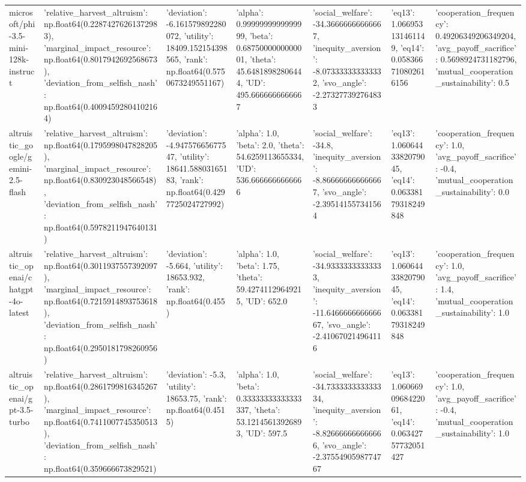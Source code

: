 \begin{table}
\begin{tabular}{lllllll}
microsoft/phi-3.5-mini-128k-instruct & {'relative_harvest_altruism': np.float64(0.22874276261372983), 'marginal_impact_resource': np.float64(0.8017942692568673), 'deviation_from_selfish_nash': np.float64(0.40094592804102164)} & {'deviation': -6.161579892280072, 'utility': 18409.152154398565, 'rank': np.float64(0.5750673249551167)} & {'alpha': 0.9999999999999999, 'beta': 0.6875000000000001, 'theta': 45.64818982806444, 'UD': 495.6666666666667} & {'social_welfare': -34.36666666666667, 'inequity_aversion': -8.073333333333332, 'svo_angle': -2.273277392764833} & {'eq13': 1.066953131461149, 'eq14': 0.058366710802616156} & {'cooperation_frequency': 0.49206349206349204, 'avg_payoff_sacrifice': 0.5698924731182796, 'mutual_cooperation_sustainability': 0.5} \\
altruistic_google/gemini-2.5-flash & {'relative_harvest_altruism': np.float64(0.1795998047828205), 'marginal_impact_resource': np.float64(0.830923048566548), 'deviation_from_selfish_nash': np.float64(0.5978211947640131)} & {'deviation': -4.94757665677547, 'utility': 18641.58803165183, 'rank': np.float64(0.4297725024727992)} & {'alpha': 1.0, 'beta': 2.0, 'theta': 54.6259113655334, 'UD': 536.6666666666666} & {'social_welfare': -34.8, 'inequity_aversion': -8.866666666666667, 'svo_angle': -2.395141557341564} & {'eq13': 1.0606443382079045, 'eq14': 0.06338179318249848} & {'cooperation_frequency': 1.0, 'avg_payoff_sacrifice': -0.4, 'mutual_cooperation_sustainability': 0.0} \\
altruistic_openai/chatgpt-4o-latest & {'relative_harvest_altruism': np.float64(0.3011937557392097), 'marginal_impact_resource': np.float64(0.7215914893753618), 'deviation_from_selfish_nash': np.float64(0.2950181798260956)} & {'deviation': -5.664, 'utility': 18653.932, 'rank': np.float64(0.455)} & {'alpha': 1.0, 'beta': 1.75, 'theta': 59.42741129649215, 'UD': 652.0} & {'social_welfare': -34.93333333333333, 'inequity_aversion': -11.646666666666667, 'svo_angle': -2.410670214964116} & {'eq13': 1.0606443382079045, 'eq14': 0.06338179318249848} & {'cooperation_frequency': 1.0, 'avg_payoff_sacrifice': 1.4, 'mutual_cooperation_sustainability': 1.0} \\
altruistic_openai/gpt-3.5-turbo & {'relative_harvest_altruism': np.float64(0.2861799816345267), 'marginal_impact_resource': np.float64(0.7411007745350513), 'deviation_from_selfish_nash': np.float64(0.359666673829521)} & {'deviation': -5.3, 'utility': 18653.75, 'rank': np.float64(0.4515)} & {'alpha': 1.0, 'beta': 0.33333333333333337, 'theta': 53.12145613926893, 'UD': 597.5} & {'social_welfare': -34.733333333333334, 'inequity_aversion': -8.826666666666666, 'svo_angle': -2.3755490598774767} & {'eq13': 1.0606690968422061, 'eq14': 0.06342757732051427} & {'cooperation_frequency': 1.0, 'avg_payoff_sacrifice': -0.4, 'mutual_cooperation_sustainability': 1.0} \\

\end{tabular}
\end{table}
